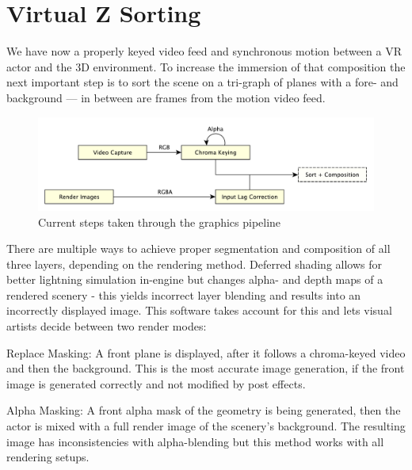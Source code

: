 %
\section{Virtual Z Sorting}

We have now a properly keyed video feed and synchronous motion between a VR 
actor and the 3D environment. To increase the immersion of that composition the 
next important step is to sort the scene on a tri-graph of planes with a fore- 
and background --- in between are frames from the motion video feed.

\begin{figure}[h]
	\includegraphics[width=\textwidth]{gfx/pipeline/4_5_composition.pdf}
	\caption{Current steps taken through the graphics pipeline}
	\label{fig:steps:composition}
\end{figure}

There are multiple ways to achieve proper segmentation and composition of all 
three layers, depending on the rendering method. Deferred shading allows for 
better lightning simulation in-engine but changes alpha- and depth maps of a 
rendered scenery - this yields incorrect layer blending and results into an 
incorrectly displayed image. This software takes account for this and lets 
visual artists decide between two render modes:

\begin{my_list}
	\item Replace Masking: A front plane is displayed, after it follows a 
	chroma-keyed video and then the background. This is the most accurate image 
	generation, if the front image is generated correctly and not modified by 
	post effects.
	\item Alpha Masking: A front alpha mask of the geometry is being generated, 
	then the actor is mixed with a full render image of the scenery's
	background. The resulting image has inconsistencies with alpha-blending but 
	this method works with all rendering setups.
\end{my_list}

